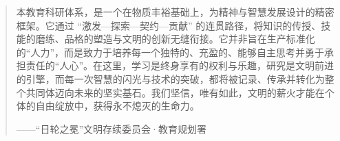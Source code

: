 \begin{quote}
本教育科研体系，是一个在物质丰裕基础上，为精神与智慧发展设计的精密框架。它通过 ``激发---探索---契约---贡献'' 的连贯路径，将知识的传授、技能的磨练、品格的塑造与文明的创新无缝衔接。它并非旨在生产标准化的``人力''，而是致力于培养每一个独特的、充盈的、能够自主思考并勇于承担责任的``人心''。在这里，学习是终身享有的权利与乐趣，研究是文明前进的引擎，而每一次智慧的闪光与技术的突破，都将被记录、传承并转化为整个共同体迈向未来的坚实基石。我们坚信，唯有如此，文明的薪火才能在个体的自由绽放中，获得永不熄灭的生命力。

------``日轮之冕''文明存续委员会·教育规划署

\end{quote}
